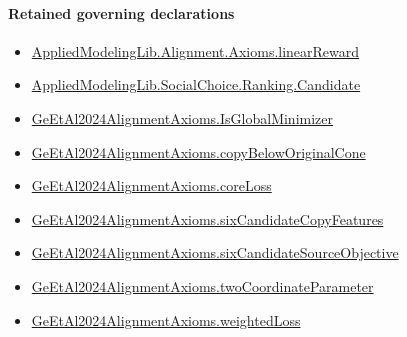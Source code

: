 \documentclass[10pt]{article}
\begin{document}
\paragraph{Retained governing declarations}
\begin{itemize}\raggedright
\item \hyperlink{library-prerequisite-4a32ddda17499d70}{Applied\allowbreak{}Modeling\allowbreak{}Lib.\allowbreak{}Alignment.\allowbreak{}Axioms.\allowbreak{}linear\allowbreak{}Reward}
\item \hyperlink{library-prerequisite-8c0e6c25845ae78a}{Applied\allowbreak{}Modeling\allowbreak{}Lib.\allowbreak{}Social\allowbreak{}Choice.\allowbreak{}Ranking.\allowbreak{}Candidate}
\item \hyperlink{governing-declaration-b949f8b742cc6742}{Ge\allowbreak{}Et\allowbreak{}Al2024\allowbreak{}Alignment\allowbreak{}Axioms.\allowbreak{}Is\allowbreak{}Global\allowbreak{}Minimizer}
\item \hyperlink{governing-declaration-d0e20c758570fcf6}{Ge\allowbreak{}Et\allowbreak{}Al2024\allowbreak{}Alignment\allowbreak{}Axioms.\allowbreak{}copy\allowbreak{}Below\allowbreak{}Original\allowbreak{}Cone}
\item \hyperlink{governing-declaration-009b8ab63bc34e01}{Ge\allowbreak{}Et\allowbreak{}Al2024\allowbreak{}Alignment\allowbreak{}Axioms.\allowbreak{}core\allowbreak{}Loss}
\item \hyperlink{governing-declaration-f2ecd36c5ee0c77a}{Ge\allowbreak{}Et\allowbreak{}Al2024\allowbreak{}Alignment\allowbreak{}Axioms.\allowbreak{}six\allowbreak{}Candidate\allowbreak{}Copy\allowbreak{}Features}
\item \hyperlink{governing-declaration-860b6034e7e4713e}{Ge\allowbreak{}Et\allowbreak{}Al2024\allowbreak{}Alignment\allowbreak{}Axioms.\allowbreak{}six\allowbreak{}Candidate\allowbreak{}Source\allowbreak{}Objective}
\item \hyperlink{governing-declaration-9a763b52051bd8db}{Ge\allowbreak{}Et\allowbreak{}Al2024\allowbreak{}Alignment\allowbreak{}Axioms.\allowbreak{}two\allowbreak{}Coordinate\allowbreak{}Parameter}
\item \hyperlink{governing-declaration-f0a1abe56bab7307}{Ge\allowbreak{}Et\allowbreak{}Al2024\allowbreak{}Alignment\allowbreak{}Axioms.\allowbreak{}weighted\allowbreak{}Loss}
\end{itemize}
\end{document}
